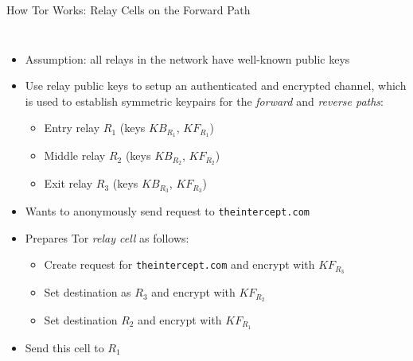 \documentclass[9pt,a4paper]{beamer}
\begin{document}
\begin{frame}{How Tor Works: Relay Cells on the Forward Path}
\begin{columns}
    \begin{itemize}
      \small
      \item Assumption: all relays in the network have well-known public keys
      \item<2-> Use relay public keys to setup an authenticated and encrypted
        channel, which is used to establish symmetric keypairs for the
        \emph{forward} and \emph{reverse paths}:
        \begin{itemize}
          \item Entry relay $R_1$ (keys $KB_{R_1}$, $KF_{R_1}$)
          \item Middle relay $R_2$ (keys $KB_{R_2}$, $KF_{R_2}$)
          \item Exit relay $R_3$ (keys $KB_{R_3}$, $KF_{R_3}$)
        \end{itemize}
      \item<3-> Wants to anonymously send request to \texttt{theintercept.com}
      \item<4-> Prepares Tor \emph{relay cell} as follows:
        \begin{itemize}
          \item<4-> Create request for \texttt{theintercept.com} and encrypt with $KF_{R_3}$
          \item<5-> Set destination as $R_3$ and encrypt with $KF_{R_2}$
          \item<6-> Set destination $R_2$ and encrypt with $KF_{R_1}$
        \end{itemize}
      \item<7-> Send this cell to $R_1$
    \end{itemize}
  \end{columns}
\end{frame}
\end{document}
